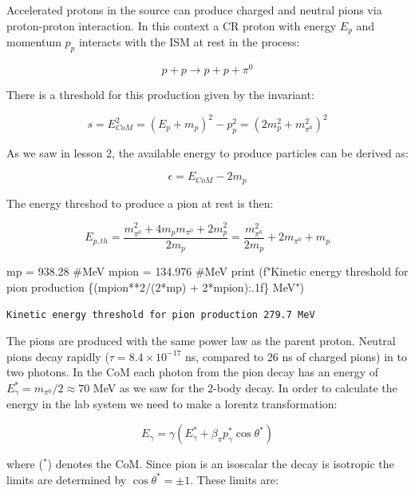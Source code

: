 \documentclass[
  letterpaper,
  DIV=11,
  numbers=noendperiod]{scrreprt}
\newenvironment{Shaded}{\begin{snugshade}}{\end{snugshade}}
\newcommand{\BuiltInTok}[1]{\textcolor[rgb]{0.00,0.23,0.31}{#1}}
\newcommand{\CommentTok}[1]{\textcolor[rgb]{0.37,0.37,0.37}{#1}}
\newcommand{\DecValTok}[1]{\textcolor[rgb]{0.68,0.00,0.00}{#1}}
\newcommand{\FloatTok}[1]{\textcolor[rgb]{0.68,0.00,0.00}{#1}}
\newcommand{\NormalTok}[1]{\textcolor[rgb]{0.00,0.23,0.31}{#1}}
\newcommand{\OperatorTok}[1]{\textcolor[rgb]{0.37,0.37,0.37}{#1}}
\newcommand{\SpecialCharTok}[1]{\textcolor[rgb]{0.37,0.37,0.37}{#1}}
\newcommand{\SpecialStringTok}[1]{\textcolor[rgb]{0.13,0.47,0.30}{#1}}
\begin{document}
Accelerated protons in the source can produce charged and neutral pions
via proton-proton interaction. In this context a CR proton with energy
\(E_p\) and momentum \(p_p\) interacts with the ISM at rest in the
process:

\[ p + p \rightarrow p + p + \pi^0\]

There is a threshold for this production given by the invariant:

\[s = E_{CoM}^2 = (E_p + m_p)^2 - p_p^2 = (2m_p^2 + m_{\pi^0}^2)^2 \]

As we saw in lesson 2, the available energy to produce particles can be
derived as:

\[\epsilon = E_{CoM} - 2m_p \]

The energy threshod to produce a pion at rest is then:

\[E_{p,th} = \frac{m_{\pi^0}^2 + 4m_p m_{\pi^0} + 2m_p^2}{ 2 m_p} = \frac{m_{\pi^0}^2}{2m_p} + 2 m_{\pi^0} + m_p\]

\begin{Shaded}
\begin{Highlighting}[]
\NormalTok{mp }\OperatorTok{=} \FloatTok{938.28} \CommentTok{\#MeV}
\NormalTok{mpion }\OperatorTok{=} \FloatTok{134.976} \CommentTok{\#MeV}
\BuiltInTok{print}\NormalTok{ (}\SpecialStringTok{f"Kinetic energy threshold for pion production }\SpecialCharTok{\{}\NormalTok{(mpion}\OperatorTok{**}\DecValTok{2}\OperatorTok{/}\NormalTok{(}\DecValTok{2}\OperatorTok{*}\NormalTok{mp) }\OperatorTok{+} \DecValTok{2}\OperatorTok{*}\NormalTok{mpion)}\SpecialCharTok{:.1f\}}\SpecialStringTok{ MeV"}\NormalTok{)}
\end{Highlighting}
\end{Shaded}

\begin{verbatim}
Kinetic energy threshold for pion production 279.7 MeV
\end{verbatim}

The pions are produced with the same power law as the parent proton.
Neutral pions decay rapidly (\(\tau = 8.4 \times 10^{-17}\) ns, compared
to 26 ns of charged pions) in to two photons. In the CoM each photon
from the pion decay has an energy of
\(E^{*}_\gamma = m_{\pi^0}/2 \approx 70\) MeV as we saw for the 2-body
decay. In order to calculate the energy in the lab system we need to
make a lorentz transformation:

\[E_\gamma = \gamma(E^{*}_\gamma + \beta_\pi p^{*}_\gamma \cos\theta^{*})\]

where (\(^*\)) denotes the CoM. Since pion is an isoscalar the decay is
isotropic the limits are determined by \(\cos\theta^{*} = \pm 1\). These
limits are:
\end{document}
